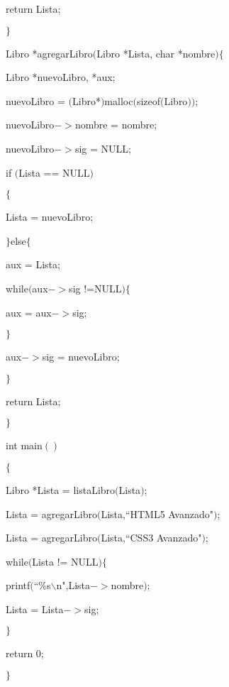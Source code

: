 \documentclass[]{article}
\begin{document}
	return Lista;
	
	$\rbrace$
	
	Libro *agregarLibro$($Libro *Lista, char *nombre$)$$\lbrace$
	
	Libro *nuevoLibro, *aux;
	
	nuevoLibro = $($Libro*$)$malloc$($sizeof$($Libro$))$;
	
	nuevoLibro$->$nombre = nombre;
	
	nuevoLibro$->$sig = NULL;
	
	if $($Lista == NULL$)$
	
	$\lbrace$
	
	Lista = nuevoLibro;
	
	$\rbrace$else$\lbrace$
	
	aux = Lista;
	
	while$($aux$->$sig !=NULL$)$$\lbrace$
	
	aux = aux$->$sig;
	
	$\rbrace$
	
	aux$->$sig = nuevoLibro;
	
	$\rbrace$
	
	return Lista;
	
	$\rbrace$
	
	int main$()$
	
	$\lbrace$
	
	Libro *Lista = listaLibro$($Lista$)$;
	
	Lista = agregarLibro$($Lista,``HTML5 Avanzado"$)$;
	
	Lista = agregarLibro$($Lista,``CSS3 Avanzado"$)$;
	
	while$($Lista != NULL$)$$\lbrace$
	
	printf$($``\%s$\backslash$n",Lista$->$nombre$)$;
	
	Lista = Lista$->$sig;
	
	$\rbrace$
	
	return 0;
	
	$\rbrace$
	
\end{document}

